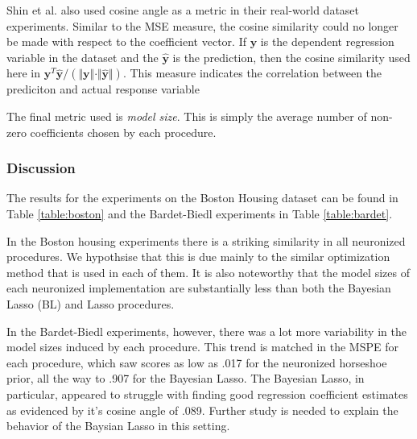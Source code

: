 Shin et al. also used cosine angle as a metric in their real-world dataset experiments.
Similar to the MSE measure, the cosine similarity could no longer be made with respect to the coefficient vector.
If $\mathbf{y}$ is the dependent regression variable in the dataset and the $\mathbf{\hat{y}}$ is the prediction, then the cosine similarity used here in $\mathbf{y}^T \mathbf{\hat{y}}/(\Vert\mathbf{y}\Vert\cdot\Vert\mathbf{\hat{y}}\Vert)$.
This measure indicates the correlation between the prediciton and actual response variable

The final metric used is \textit{model size}.
This is simply the average number of non-zero coefficients chosen by each procedure. 
\subsubsection{Discussion}
\label{real_world_discuss}
The results for the experiments on the Boston Housing dataset can be found in Table \ref{table:boston} and the Bardet-Biedl experiments in Table \ref{table:bardet}.


In the Boston housing experiments there is a striking similarity in all neuronized procedures.
We hypothsise that this is due mainly to the similar optimization method that is used in each of them. 
It is also noteworthy that the model sizes of each neuronized implementation are substantially less than both the Bayesian Lasso (BL) and Lasso procedures.



In the Bardet-Biedl experiments, however, there was a lot more variability in the model sizes induced by each procedure. 
This trend is matched in the MSPE for each procedure, which saw scores as low as .017 for the neuronized horseshoe prior, all the way to .907 for the Bayesian Lasso. 
The Bayesian Lasso, in particular, appeared to struggle with finding good regression coefficient estimates as evidenced by it's cosine angle of .089. 
Further study is needed to explain the behavior of the Baysian Lasso in this setting.
